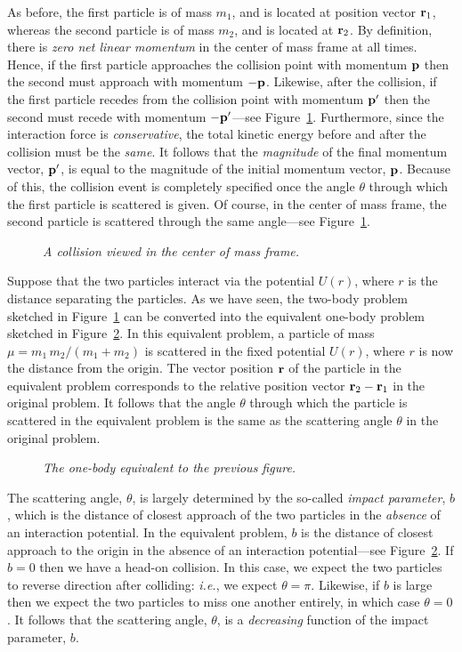 As before, the first particle is of mass $m_1$, and is located at position
vector ${\bf r}_1$, whereas the second particle is of mass $m_2$,
and is located at ${\bf r}_2$.
By definition,  there is {\em zero net linear momentum}\/ in the center of mass
frame at all times. Hence, if the first particle approaches the collision
point with momentum ${\bf p}$ then the second must approach
with momentum ${\bf -p}$. Likewise, after the collision, if the
first particle recedes from the collision point with momentum ${\bf p}'$ 
then the second  must recede with momentum $-{\bf p}'$---see Figure~\ref{coll}. Furthermore, since the interaction force is
{\em conservative}, the total kinetic energy before and after the collision must
be the {\em same}. It follows that the {\em magnitude}\/ of the final momentum
vector, ${\bf p}'$, is equal to the magnitude of the initial momentum vector, ${\bf p}$. Because of this, the collision event is completely specified
once the angle $\theta$ through which the
first particle is scattered  is given. Of course, in the center of mass frame, the second particle
is scattered through the same angle---see Figure~\ref{coll}.

\begin{figure}
\epsfysize=2.5in
\centerline{}
\caption{\em A collision viewed in the center of mass frame.}\label{coll}
\end{figure}

Suppose that the two particles interact via the potential $U(r)$, where $r$
is the distance separating the particles. As we have seen, the two-body
problem sketched in Figure~\ref{coll} can be converted into the
equivalent one-body problem sketched in Figure~\ref{coll1}. In this
equivalent problem, a particle of mass $\mu=m_1\,m_2/(m_1+m_2)$ is scattered
in the fixed potential $U(r)$, where $r$ is now the distance from the origin.
The vector position ${\bf r}$ of the particle in the equivalent problem corresponds to the relative position vector ${\bf r}_2-{\bf r}_1$ in the original problem.
It follows that the angle $\theta$ through which the particle is scattered in the equivalent
problem is the same as the scattering angle $\theta$ in the original problem.

\begin{figure}
\epsfysize=2.5in
\centerline{}
\caption{\em The one-body equivalent to the previous figure.}\label{coll1}
\end{figure}

The scattering angle, $\theta$, is largely
determined by the so-called {\em impact parameter}, $b$, which is the
distance of closest approach of the two particles in the {\em absence}\/ of an
interaction potential. In the equivalent problem, $b$ is the distance of
closest approach to the origin in the absence of an interaction
potential---see Figure~\ref{coll1}. If $b=0$ then we have a head-on collision. In this case, we expect
the two particles to reverse direction after colliding: {\em i.e.}, we expect 
$\theta=\pi$. Likewise, if $b$ is large then we expect the two particles
to miss one another entirely, in which case $\theta=0$. It follows that the
scattering angle, $\theta$, is a {\em decreasing}\/ function of the impact parameter,
$b$. 

